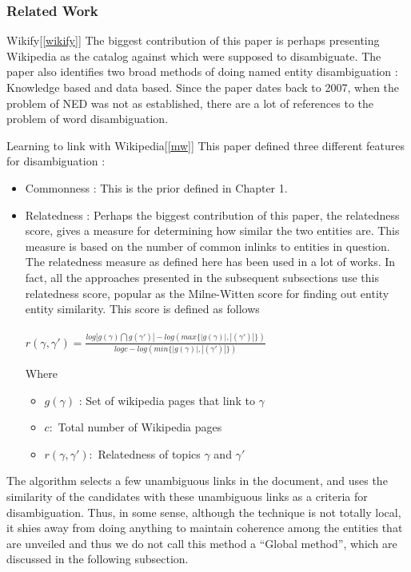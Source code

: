  \subsubsection{Related Work}

\par{Wikify[\ref{wikify}]}
The biggest contribution of this paper is perhaps presenting Wikipedia as the 
catalog against which were supposed to disambiguate. The paper also identifies
two broad methods of doing named entity disambiguation : Knowledge based and 
data based. Since the paper dates back to 2007, when the problem of NED was 
not as established, there are a lot of references to the problem of word disambiguation.

\par{Learning to link with Wikipedia[\ref{mw}]}
This paper defined three different features for disambiguation : 
\begin{itemize}
 \item Commonness  : This is the prior defined in Chapter 1.
 \item Relatedness : Perhaps the biggest contribution of this paper, the relatedness score,
 gives a measure for determining how similar the two entities are. This measure 
 is based on the number of common inlinks to entities in question.
 The relatedness measure as defined here has been used in a lot of works. In fact, all
 the approaches presented in the subsequent subsections use this relatedness score, popular
 as the Milne-Witten score for finding out entity entity similarity.
 This score is defined as follows \\ \\
 $ r(\gamma, \gamma') = \frac{log|g(\gamma) \bigcap g(\gamma')| - log(max\{|g(\gamma)|, |(\gamma')|\})} {log c - log(min\{|g(\gamma)|, |(\gamma')|\})}$ 
 
 Where 
   \begin{itemize}
    \item $g(\gamma)$ : Set of wikipedia pages that link to $\gamma$
    \item $c :$ Total number of Wikipedia pages
    \item $r(\gamma, \gamma') :$ Relatedness of topics $\gamma$ and $\gamma'$
   \end{itemize}\bigskip

 
\end{itemize}
The algorithm selects a few unambiguous links in the document, and uses the similarity of the candidates
with these unambiguous links as a criteria for disambiguation.
Thus, in some sense, although the technique is not totally local, it shies away from doing anything to maintain
coherence among the entities that are unveiled and thus we do not call this method a ``Global method'', which 
are discussed in the following subsection.


